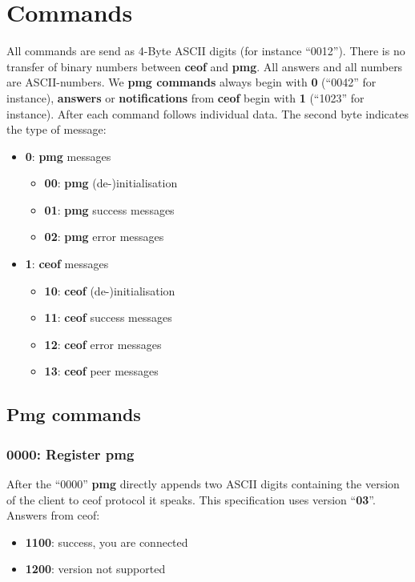 \documentclass[12pt,a4paper]{book}
\begin{document}
\section{Commands}
All commands are send as 4-Byte ASCII digits (for instance "`0012"').
There is no transfer of binary numbers between \textbf{ceof} and \textbf{pmg}.
All answers and all numbers are ASCII-numbers. We
\textbf{pmg commands} always begin with \textbf{0} ("`0042"' for instance),
\textbf{answers} or \textbf{notifications} from
\textbf{ceof} begin with \textbf{1} ("`1023"' for instance).
After each command follows individual data. The second byte indicates the type of message:
\begin{itemize}
\item \textbf{0}: \textbf{pmg} messages
\begin{itemize}
\item \textbf{00}: \textbf{pmg} (de-)initialisation
\item \textbf{01}: \textbf{pmg} success messages
\item \textbf{02}: \textbf{pmg} error messages
\end{itemize}
\item \textbf{1}: \textbf{ceof} messages
\begin{itemize}
\item \textbf{10}: \textbf{ceof} (de-)initialisation
\item \textbf{11}: \textbf{ceof} success messages
\item \textbf{12}: \textbf{ceof} error messages
\item \textbf{13}: \textbf{ceof} peer messages
\end{itemize}
\end{itemize}

\subsection{Pmg commands}
\subsubsection{0000: Register pmg}
After the "`0000"' \textbf{pmg} directly appends two ASCII digits containing the
version of the client to ceof protocol it speaks. This specification
uses version "`\textbf{03}"'.
Answers from ceof:
\begin{itemize}
\item \textbf{1100}: success, you are connected
\item \textbf{1200}: version not supported
\end{itemize}
\end{document}
